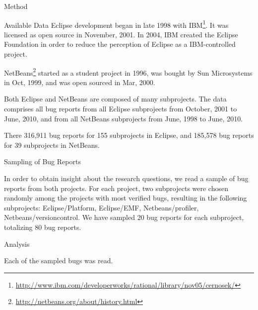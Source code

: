 \begin{section}{Method}
\begin{subsection}{Available Data}
	Eclipse development began in late 1998 with IBM\footnote{\url{http://www.ibm.com/developerworks/rational/library/nov05/cernosek/}}. It was licensed as open source in November, 2001. In 2004, IBM created the Eclipse Foundation in order to reduce the perception of Eclipse as a IBM-controlled project.
	
	NetBeans\footnote{\url{http://netbeans.org/about/history.html}} started  as a student project in 1996, was bought by Sun Microsystems in Oct, 1999, and was open sourced in Mar, 2000.

	Both Eclipse and NetBeans are composed of many subprojects. The data comprises all bug reports from all Eclipse subprojects from October, 2001 to June, 2010, and from all NetBeans subprojects from June, 1998 to June, 2010.
	
	There 316,911 bug reports for 155 subprojects in Eclipse, and 185,578 bug reports for 39 subprojects in NetBeans.
	
\end{subsection}

\begin{subsection}{Sampling of Bug Reports}
	
	In order to obtain insight about the research questions, we read a sample of bug reports from both projects. For each project, two subprojects were chosen randomly among the projects with most verified bugs, resulting in the following subprojects: Eclipse/Platform, Eclipse/EMF, Netbeans/profiler, Netbeans/versioncontrol. We have sampled 20 bug reports for each subproject, totalizing 80 bug reports.
	
\end{subsection}

\begin{subsection}{Analysis}
	
	Each of the sampled bugs was read.
	
	
\end{subsection}

\end{section}

